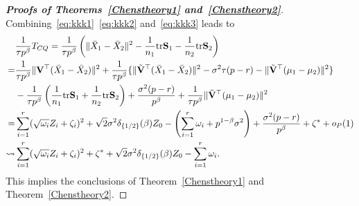 \documentclass[times,sort&compress,3p]{elsarticle}
\newcommand{\mytr}{ {\rm tr} }
\theoremstyle{plain}
\theoremstyle{definition}
\theoremstyle{remark}
\begin{document}
\begin{appendices}
\begin{proof}[\textbf{Proofs of Theorems~\ref{Chenstheory1} and~\ref{Chenstheory2}}]
    Combining~\eqref{eq:kkk1}~\eqref{eq:kkk2} and~\eqref{eq:kkk3} leads to
\begin{align*}
    &\frac{1}{\tau p^{\beta}} T_{CQ}
    =\frac{1}{\tau p^{\beta}}\left(\|\bar{X}_1-\bar{X}_2\|^2-\frac{1}{n_1}\mytr \BS_1-\frac{1}{n_2}\mytr \BS_2\right)\\
    =&
    \frac{1}{\tau p^{\beta}}{\|\BV^\top (\bar{X}_1-\bar{X}_2)\|^2}+
    \frac{1}{\tau p^{\beta}} \{{\|\tilde{\BV}^\top (\bar{X}_1-\bar{X}_2)\|^2-\sigma^2 \tau(p-r)-\|\tilde{\BV}^\top (\mu_1-\mu_2)\|^2}\}\\
    &-\frac{1}{\tau p^{\beta}}\left(\frac{1}{n_1}\mytr \BS_1+\frac{1}{n_2}\mytr \BS_2\right)+\frac{\sigma^2 (p-r)}{p^\beta}+\frac{1}{\tau p^\beta}\|\tilde{\BV}^\top (\mu_1-\mu_2)\|^2\\
    =&
    \sum_{i=1}^r (\sqrt{\omega_i} Z_i+\zeta_i )^2+
\sqrt{2} \sigma^2 \delta_{\{{1}/{2}\}}(\beta)Z_0
    -
    \left(\sum_{i=1}^r \omega_i+p^{1-\beta}\sigma^2\right)
    +\frac{\sigma^2 (p-r)}{p^\beta}+\zeta^*+o_P(1)\\
    \rightsquigarrow &
    \sum_{i=1}^r (\sqrt{\omega_i} Z_i+\zeta_i )^2+
\zeta^*+
\sqrt{2}\sigma^2 \delta_{\{{1}/{2}\}}(\beta)Z_0
    -
    \sum_{i=1}^r \omega_i.
\end{align*}
    This implies the conclusions of Theorem~\ref{Chenstheory1} and Theorem~\ref{Chenstheory2}.


\end{proof}


\end{appendices}
\end{document}
